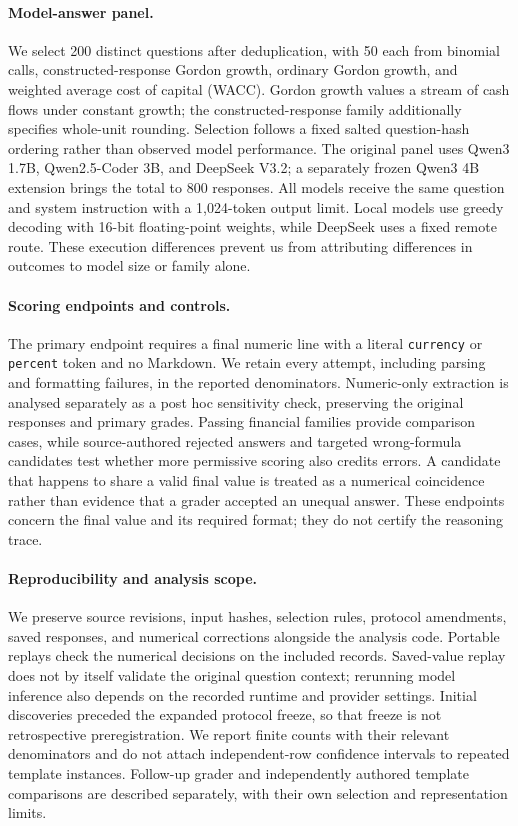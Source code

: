 \paragraph{Model-answer panel.}
We select 200 distinct questions after deduplication, with 50 each from binomial calls, constructed-response Gordon growth, ordinary Gordon growth, and weighted average cost of capital (WACC). Gordon growth values a stream of cash flows under constant growth; the constructed-response family additionally specifies whole-unit rounding. Selection follows a fixed salted question-hash ordering rather than observed model performance. The original panel uses Qwen3 1.7B, Qwen2.5-Coder 3B, and DeepSeek V3.2; a separately frozen Qwen3 4B extension brings the total to 800 responses. All models receive the same question and system instruction with a 1,024-token output limit. Local models use greedy decoding with 16-bit floating-point weights, while DeepSeek uses a fixed remote route. These execution differences prevent us from attributing differences in outcomes to model size or family alone.

\paragraph{Scoring endpoints and controls.}
The primary endpoint requires a final numeric line with a literal \texttt{currency} or \texttt{percent} token and no Markdown. We retain every attempt, including parsing and formatting failures, in the reported denominators. Numeric-only extraction is analysed separately as a post hoc sensitivity check, preserving the original responses and primary grades. Passing financial families provide comparison cases, while source-authored rejected answers and targeted wrong-formula candidates test whether more permissive scoring also credits errors. A candidate that happens to share a valid final value is treated as a numerical coincidence rather than evidence that a grader accepted an unequal answer. These endpoints concern the final value and its required format; they do not certify the reasoning trace.

\paragraph{Reproducibility and analysis scope.}
We preserve source revisions, input hashes, selection rules, protocol amendments, saved responses, and numerical corrections alongside the analysis code. Portable replays check the numerical decisions on the included records. Saved-value replay does not by itself validate the original question context; rerunning model inference also depends on the recorded runtime and provider settings. Initial discoveries preceded the expanded protocol freeze, so that freeze is not retrospective preregistration. We report finite counts with their relevant denominators and do not attach independent-row confidence intervals to repeated template instances. Follow-up grader and independently authored template comparisons are described separately, with their own selection and representation limits.

